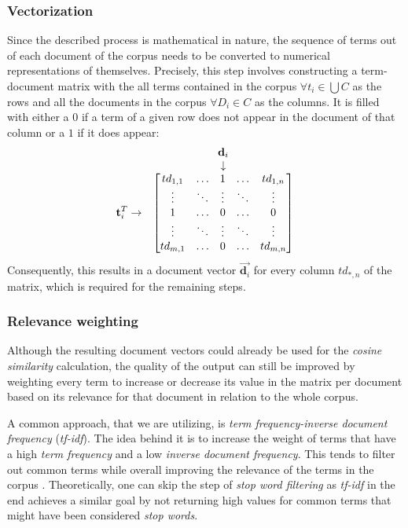 \documentclass[12pt,a4paper]{report}
\begin{document}
\subsubsection{Vectorization}
Since the described process is mathematical in nature,
the sequence of terms out of each document of the corpus needs to be
converted to numerical representations of themselves. Precisely, this step
involves constructing a term-document matrix with the all terms contained in
the corpus \(\forall t_i \in \bigcup C\) as the rows and all the documents in
the corpus \(\forall D_i \in C\) as the columns. It is filled with either a
\(0\) if a term of a given row does not appear in the document of that column or
a \(1\) if it does appear:
\[
  \begin{matrix}
    & \textbf d_i \\
    & \downarrow \\
    \textbf t_i^{T} \rightarrow &
    \begin{bmatrix}
      td_{1,1}  & \dots   & 1       & \dots   & td_{1,n}  \\
      \vdots    & \ddots  & \vdots  & \ddots  & \vdots    \\
      1         & \dots   & 0       & \dots   & 0         \\
      \vdots    & \ddots  & \vdots  & \ddots  & \vdots    \\
      td_{m,1}  & \dots   & 0       & \dots   & td_{m,n}  \\
    \end{bmatrix}
  \end{matrix}
\]
Consequently, this results in a document vector \(\vec{\mathbf d_i}\)
for every column \(td_{*,n}\) of the matrix, which is required for the remaining steps.


\subsubsection{Relevance weighting}
Although the resulting document vectors
could already be used for the \textit{cosine similarity} calculation, the
quality of the output can still be improved by weighting every term to increase
or decrease its value in the matrix per document based on its relevance for
that document in relation to the whole corpus.

A common approach, that we are utilizing, is \textit{term frequency-inverse
document frequency} (\textit{tf-idf}). The idea behind it is to increase the
weight of terms that have a high \textit{term frequency} and a low
\textit{inverse document frequency}. This tends to filter out common terms while
overall improving the relevance of the terms in the corpus \cite{
robertson2004tfidf, singhal2001ir}. Theoretically, one can skip the step of
\textit{stop word filtering} as \textit{tf-idf} in the end achieves a similar
goal by not returning high values for common terms that might have been
considered \textit{stop words}.
\end{document}
